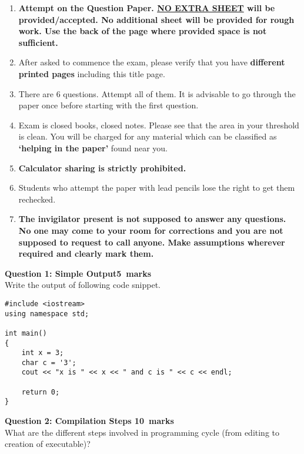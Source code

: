 \documentclass[12pt,a4paper]{article}
\def\QOne{5}
\def\Qtwo{10}
\begin{document}
\begin{enumerate}
\item \textbf{Attempt on the Question Paper. \underline{NO EXTRA SHEET} will be provided/accepted. No
additional sheet will be provided for rough work. Use the back of the page where
provided space is not sufficient.}
\item After asked to commence the exam, please verify that you have \textbf{\pageref{LastPage} different
printed pages} including this title page.
\item There are 6 questions. Attempt all of them. It is advisable to go through the paper once
before starting with the first question.
\item Exam is closed books, closed notes. Please see that the area in your threshold is clean.
You will be charged for any material which can be classified as \textbf{`helping in the paper'}
found near you.
\item \textbf{Calculator sharing is strictly prohibited.}
\item Students who attempt the paper with lead pencils lose the right to get them rechecked.
\item \textbf{The invigilator present is not supposed to answer any questions. No one may come
to your room for corrections and you are not supposed to request to call anyone.
Make assumptions wherever required and clearly mark them.}
\end{enumerate}
\newpage
\noindent\textbf{Question 1: Simple Output\hfill \QOne~marks}\\
Write the output of following code snippet.
\begin{lstlisting}
#include <iostream>
using namespace std;

int main()
{
	int x = 3;
	char c = '3';
	cout << "x is " << x << " and c is " << c << endl;
	
	return 0;
}
\end{lstlisting}
\begin{figure}[H]
\end{figure}

\noindent\textbf{Question 2: Compilation Steps \hfill \Qtwo~marks}\\
What are the different steps involved in programming cycle (from editing to creation of executable)? 
\begin{figure}[H]
\end{figure}
\end{document}
